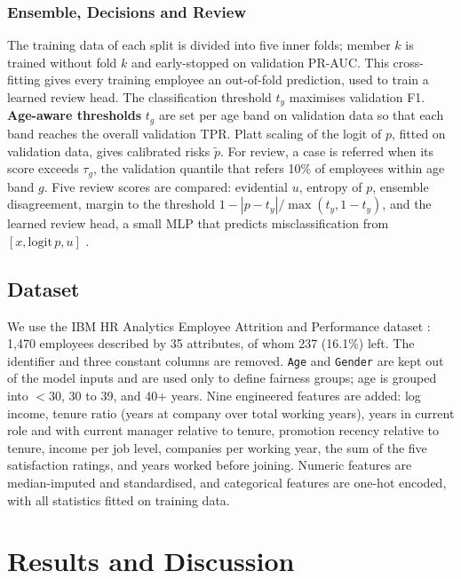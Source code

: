 \documentclass[conference]{IEEEtran}
\begin{document}
\subsubsection{Ensemble, Decisions and Review}
The training data of each split is divided into five inner folds; member $k$ is trained without fold $k$ and early-stopped on validation PR-AUC. This cross-fitting gives every training employee an out-of-fold prediction, used to train a learned review head. The classification threshold $t_y$ maximises validation F1. \textbf{Age-aware thresholds} $t_g$ are set per age band on validation data so that each band reaches the overall validation TPR. Platt scaling \cite{platt1999} of the logit of $p$, fitted on validation data, gives calibrated risks $\tilde p$. For review, a case is referred when its score exceeds $\tau_g$, the validation quantile that refers 10\% of employees within age band $g$. Five review scores are compared: evidential $u$, entropy of $p$, ensemble disagreement, margin to the threshold $1-|p-t_y|/\max(t_y,1-t_y)$, and the learned review head, a small MLP that predicts misclassification from $[x,\mathrm{logit}\,p,u]$ \cite{madras2018}.

\subsection{Dataset}
We use the IBM HR Analytics Employee Attrition and Performance dataset \cite{ibmdata}: 1{,}470 employees described by 35 attributes, of whom 237 (16.1\%) left. The identifier and three constant columns are removed. \texttt{Age} and \texttt{Gender} are kept out of the model inputs and are used only to define fairness groups; age is grouped into $<$30, 30 to 39, and 40+ years. Nine engineered features are added: log income, tenure ratio (years at company over total working years), years in current role and with current manager relative to tenure, promotion recency relative to tenure, income per job level, companies per working year, the sum of the five satisfaction ratings, and years worked before joining. Numeric features are median-imputed and standardised, and categorical features are one-hot encoded, with all statistics fitted on training data.



\section{Results and Discussion}
\end{document}
